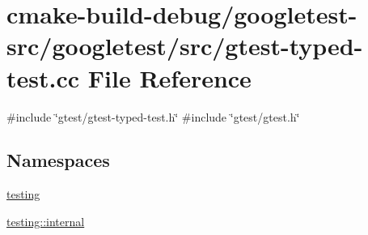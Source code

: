 \hypertarget{gtest-typed-test_8cc}{}\section{cmake-\/build-\/debug/googletest-\/src/googletest/src/gtest-\/typed-\/test.cc File Reference}
\label{gtest-typed-test_8cc}
{\ttfamily \#include \char`\"{}gtest/gtest-\/typed-\/test.\+h\char`\"{}}\newline
{\ttfamily \#include \char`\"{}gtest/gtest.\+h\char`\"{}}\newline
\subsection*{Namespaces}
\begin{DoxyCompactItemize}
\item 
 \mbox{\hyperlink{namespacetesting}{testing}}
\item 
 \mbox{\hyperlink{namespacetesting_1_1internal}{testing\+::internal}}
\end{DoxyCompactItemize}
